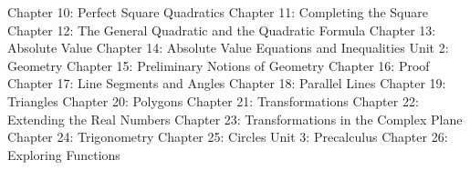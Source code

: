 \documentclass{book} %
\begin{document}
\indent \footnotesize{Chapter 10: Perfect Square Quadratics}
\newline
\indent \footnotesize{Chapter 11: Completing the Square}
\newline
\indent \footnotesize{Chapter 12: The General Quadratic and the Quadratic Formula}
\newline
\indent \footnotesize{Chapter 13: Absolute Value}
\newline
\indent \footnotesize{Chapter 14: Absolute Value Equations and Inequalities}
\newline
\small{Unit 2: Geometry}
\newline
\indent \footnotesize{Chapter 15: Preliminary Notions of Geometry}
\newline
\indent \footnotesize{Chapter 16: Proof}
\newline
\indent \footnotesize{Chapter 17: Line Segments and Angles}
\newline
\indent \footnotesize{Chapter 18: Parallel Lines}
\newline
\indent \footnotesize{Chapter 19: Triangles}
\newline
\indent \footnotesize{Chapter 20: Polygons}
\newline
\indent \footnotesize{Chapter 21: Transformations}
\newline
\indent \footnotesize{Chapter 22: Extending the Real Numbers}
\newline
\indent \footnotesize{Chapter 23: Transformations in the Complex Plane}
\newline
\indent \footnotesize{Chapter 24: Trigonometry}
\newline
\indent \footnotesize{Chapter 25: Circles}
\newline
\small{Unit 3: Precalculus}
\newline
\indent \footnotesize{Chapter 26: Exploring Functions}

\end{document}
